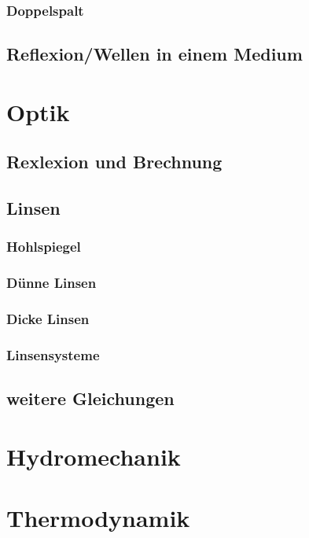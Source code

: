 \documentclass[german]{latex4ei/latex4ei_sheet}
\begin{document}
\subsubsection{Doppelspalt}
\subsection{Reflexion/Wellen in einem Medium}

\section{Optik}
\subsection{Rexlexion und Brechnung}
\subsection{Linsen}
\subsubsection{Hohlspiegel}
\subsubsection{Dünne Linsen}
\subsubsection{Dicke Linsen}
\subsubsection{Linsensysteme}
\subsection{weitere Gleichungen}

\section{Hydromechanik}

\section{Thermodynamik}
\end{document}
